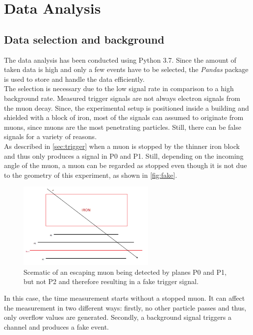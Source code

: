 \chapter{Data Analysis}
\label{sec:data_analysis}
\section{Data selection and background}
The data analysis has been conducted using Python 3.7. Since the amount of taken data is high 
and only a few events have to be selected, the \textit{Pandas} package \cite{pandas} is 
used to store and handle the data efficiently. \\

The selection is necessary due to the low signal rate in comparison to a high background rate.
Measured trigger signals are not always electron signals from the muon decay.
Since, the experimental setup is positioned inside a building and shielded with a block of iron,
 most of the signals can assumed to originate from muons, since muons are the most penetrating particles. Still, there can be false signals for a variety of reasons. \\

As described in \autoref{sec:trigger} when a muon is stopped by the thinner iron block and thus only produces a signal in P0 and P1. Still, depending on the incoming angle of the muon, a muon can be regarded as stopped even though it is not due to the geometry of this experiment, as shown in \autoref{fig:fake}.

\begin{figure}
	 \centering
	 \includegraphics[width=0.6\textwidth]{figures/falsestopping.png}
	 \caption{Scematic of an escaping muon being detected by planes P0 and P1, but not P2 and therefore resulting in a fake trigger signal.}
	 \label{fig:fake}
\end{figure}

In this case, the time measurement starts without a stopped muon. It can affect the measurement in two different ways: firstly, no other particle passes and thus, only overflow values are generated. Secondly, a background signal triggers a channel and produces a fake event.\\

